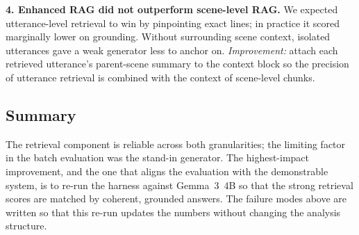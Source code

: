 \textbf{4. Enhanced RAG did not outperform scene-level RAG.} We expected
utterance-level retrieval to win by pinpointing exact lines; in practice
it scored marginally lower on grounding. Without surrounding scene
context, isolated utterances gave a weak generator less to anchor on.
\emph{Improvement:} attach each retrieved utterance's parent-scene summary
to the context block so the precision of utterance retrieval is combined
with the context of scene-level chunks.

\subsection{Summary}
The retrieval component is reliable across both granularities; the
limiting factor in the batch evaluation was the stand-in generator. The
highest-impact improvement, and the one that aligns the evaluation with
the demonstrable system, is to re-run the harness against Gemma~3~4B so
that the strong retrieval scores are matched by coherent, grounded
answers. The failure modes above are written so that this re-run updates
the numbers without changing the analysis structure.

